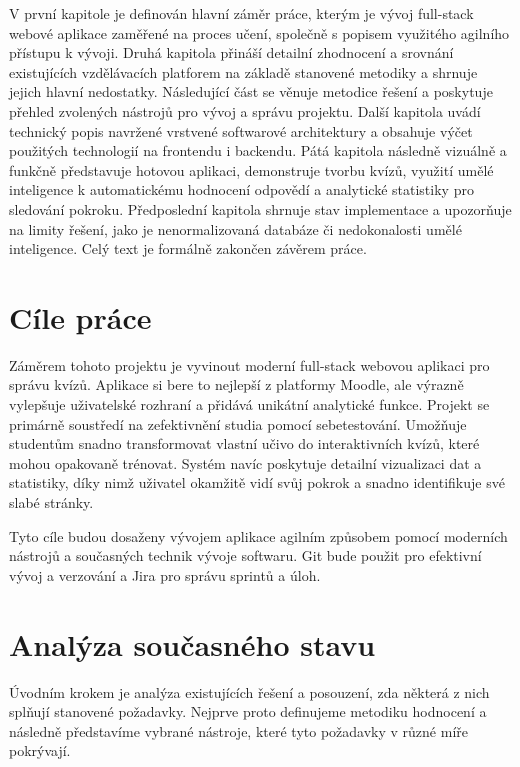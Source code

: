 \documentclass{vskpou} %
\begin{document}
V první kapitole je definován hlavní záměr práce, kterým je vývoj full-stack webové aplikace zaměřené na proces učení, společně s popisem využitého agilního přístupu k vývoji. Druhá kapitola přináší detailní zhodnocení a srovnání existujících vzdělávacích platforem na základě stanovené metodiky a shrnuje jejich hlavní nedostatky. Následující část se věnuje metodice řešení a poskytuje přehled zvolených nástrojů pro vývoj a správu projektu. Další kapitola uvádí technický popis navržené vrstvené softwarové architektury a obsahuje výčet použitých technologií na frontendu i backendu. Pátá kapitola následně vizuálně a funkčně představuje hotovou aplikaci, demonstruje tvorbu kvízů, využití umělé inteligence k automatickému hodnocení odpovědí a analytické statistiky pro sledování pokroku. Předposlední kapitola shrnuje stav implementace a upozorňuje na limity řešení, jako je nenormalizovaná databáze či nedokonalosti umělé inteligence. Celý text je formálně zakončen závěrem práce.

\section{Cíle práce}

Záměrem tohoto projektu je vyvinout moderní full-stack webovou aplikaci pro správu kvízů. Aplikace si bere to nejlepší z platformy Moodle, ale výrazně vylepšuje uživatelské rozhraní a přidává unikátní analytické funkce. Projekt se primárně soustředí na zefektivnění studia pomocí sebetestování. Umožňuje studentům snadno transformovat vlastní učivo do interaktivních kvízů, které mohou opakovaně trénovat. Systém navíc poskytuje detailní vizualizaci dat a statistiky, díky nimž uživatel okamžitě vidí svůj pokrok a snadno identifikuje své slabé stránky.

Tyto cíle budou dosaženy vývojem aplikace agilním způsobem pomocí moderních nástrojů a současných technik vývoje softwaru. Git bude použit pro efektivní vývoj a verzování a Jira pro správu sprintů a úloh.

\section{Analýza současného stavu}

Úvodním krokem je analýza existujících řešení a posouzení, zda některá z nich splňují stanovené požadavky. Nejprve proto definujeme metodiku hodnocení a následně představíme vybrané nástroje, které tyto požadavky v různé míře pokrývají.
\end{document}
